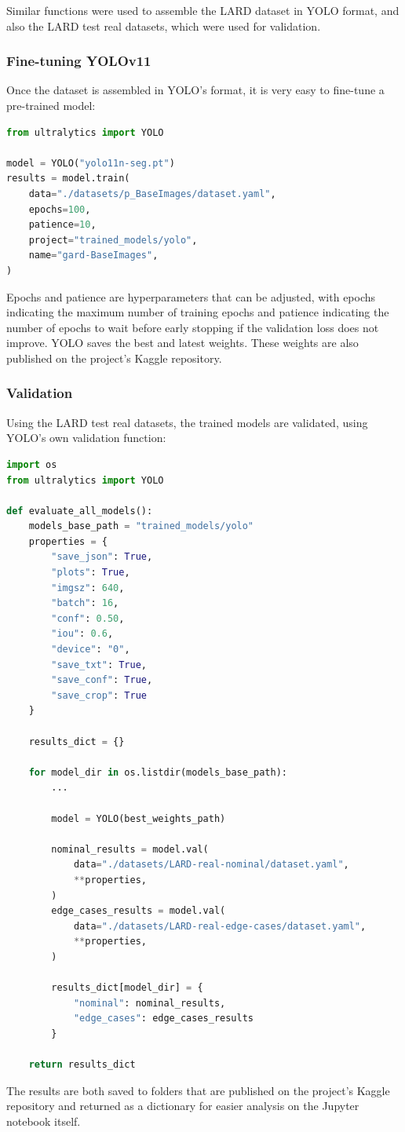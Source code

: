 Similar functions were used to assemble the LARD dataset in YOLO format, and
also the LARD test real datasets, which were used for validation.

\subsubsection{Fine-tuning YOLOv11}

Once the dataset is assembled in YOLO's format, it is very easy to fine-tune a
pre-trained model:

\begin{lstlisting}[language=Python, caption={Evaluation, fine-tuning YOLOv11}]
from ultralytics import YOLO

model = YOLO("yolo11n-seg.pt")
results = model.train(
    data="./datasets/p_BaseImages/dataset.yaml",
    epochs=100,
    patience=10,
    project="trained_models/yolo",
    name="gard-BaseImages",
)
\end{lstlisting}

Epochs and patience are hyperparameters that can be adjusted, with epochs
indicating the maximum number of training epochs and patience indicating the
number of epochs to wait before early stopping if the validation loss does not
improve. YOLO saves the best and latest weights. These weights are also
published on the project's Kaggle repository.

\subsubsection{Validation}

Using the LARD test real datasets, the trained models are validated, using
YOLO's own validation function:

\begin{lstlisting}[language=Python, caption={Evaluation, YOLOv11 validation}]
import os
from ultralytics import YOLO

def evaluate_all_models():
    models_base_path = "trained_models/yolo"
    properties = {
        "save_json": True,
        "plots": True,
        "imgsz": 640,
        "batch": 16,
        "conf": 0.50,
        "iou": 0.6,
        "device": "0",
        "save_txt": True,
        "save_conf": True,
        "save_crop": True
    }
    
    results_dict = {}
    
    for model_dir in os.listdir(models_base_path):
        ...
        
        model = YOLO(best_weights_path)

        nominal_results = model.val(
            data="./datasets/LARD-real-nominal/dataset.yaml",
            **properties,
        )
        edge_cases_results = model.val(
            data="./datasets/LARD-real-edge-cases/dataset.yaml",
            **properties,
        )
        
        results_dict[model_dir] = {
            "nominal": nominal_results,
            "edge_cases": edge_cases_results
        }

    return results_dict
\end{lstlisting}

The results are both saved to folders that are published on the project's Kaggle
repository and returned as a dictionary for easier analysis on the Jupyter
notebook itself.
